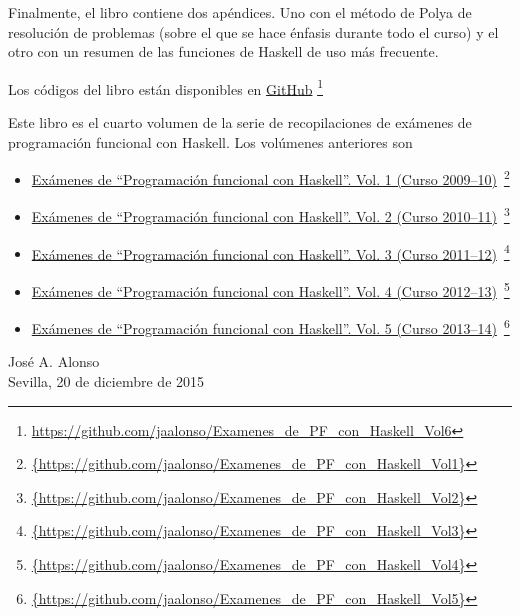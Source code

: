 \documentclass[a4paper,12pt,twoside]{book}
\begin{document}
Finalmente, el libro contiene dos apéndices. Uno con el método de Polya
de resolución de problemas (sobre el que se hace énfasis durante todo el
curso) y el otro con un resumen de las funciones de Haskell de uso más
frecuente.

Los códigos del libro están disponibles en
\href{https://github.com/jaalonso/Examenes_de_PF_con_Haskell_Vol6}
     {GitHub}
     \footnote{{\url{https://github.com/jaalonso/Examenes_de_PF_con_Haskell_Vol6}}}

Este libro es el cuarto volumen de la serie de recopilaciones de
exámenes de programación funcional con Haskell. Los volúmenes anteriores son
\begin{itemize}
\item
  \href{https://github.com/jaalonso/Examenes_de_PF_con_Haskell_Vol1}
  {Exámenes de ``Programaci\'on funcional con Haskell''.
    Vol. 1 (Curso 2009--10)}\
    \footnote{\url{{https://github.com/jaalonso/Examenes_de_PF_con_Haskell_Vol1}}}

\item
  \href{https://github.com/jaalonso/Examenes_de_PF_con_Haskell_Vol2}
  {Exámenes de ``Programaci\'on funcional con Haskell''.
    Vol. 2 (Curso 2010--11)}\
    \footnote{\url{{https://github.com/jaalonso/Examenes_de_PF_con_Haskell_Vol2}}}

\item
  \href{https://github.com/jaalonso/Examenes_de_PF_con_Haskell_Vol3}
  {Exámenes de ``Programaci\'on funcional con Haskell''.
    Vol. 3 (Curso 2011--12)}\
    \footnote{\url{{https://github.com/jaalonso/Examenes_de_PF_con_Haskell_Vol3}}}

\item
  \href{https://github.com/jaalonso/Examenes_de_PF_con_Haskell_Vol4}
  {Exámenes de ``Programaci\'on funcional con Haskell''.
    Vol. 4 (Curso 2012--13)}\
    \footnote{\url{{https://github.com/jaalonso/Examenes_de_PF_con_Haskell_Vol4}}}

\item
  \href{https://github.com/jaalonso/Examenes_de_PF_con_Haskell_Vol5}
  {Exámenes de ``Programaci\'on funcional con Haskell''.
    Vol. 5 (Curso 2013--14)}\
    \footnote{\url{{https://github.com/jaalonso/Examenes_de_PF_con_Haskell_Vol5}}}

\end{itemize}
     
\begin{flushright}
  José A. Alonso \\
  Sevilla, 20 de diciembre de 2015
\end{flushright}
\end{document}
